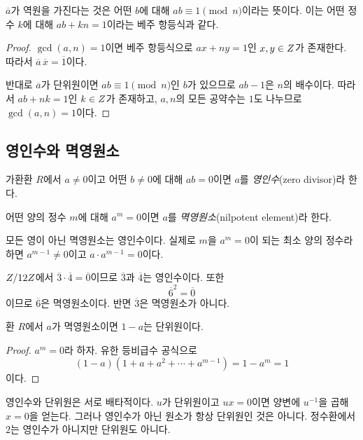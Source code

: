 \begin{proofidea}
$\overline a$가 역원을 가진다는 것은 어떤 $b$에 대해 $ab\equiv1\pmod n$이라는 뜻이다. 이는 어떤 정수 $k$에 대해 $ab+kn=1$이라는 베주 항등식과 같다.
\end{proofidea}

\begin{proof}
$\gcd(a,n)=1$이면 베주 항등식으로 $ax+ny=1$인 $x,y\in Z$가 존재한다. 따라서 $\overline a\,\overline x=\overline1$이다.

반대로 $\overline a$가 단위원이면 $ab\equiv1\pmod n$인 $b$가 있으므로 $ab-1$은 $n$의 배수이다. 따라서 $ab+nk=1$인 $k\in Z$가 존재하고, $a,n$의 모든 공약수는 $1$도 나누므로 $\gcd(a,n)=1$이다.
\end{proof}

\subsection{영인수와 멱영원소}

\begin{definition}[영인수]
가환환 $R$에서 $a\ne0$이고 어떤 $b\ne0$에 대해 $ab=0$이면 $a$를 \emph{영인수}(zero divisor)라 한다.
\end{definition}

\begin{definition}[멱영원소]
어떤 양의 정수 $m$에 대해 $a^m=0$이면 $a$를 \emph{멱영원소}(nilpotent element)라 한다.
\end{definition}

모든 영이 아닌 멱영원소는 영인수이다. 실제로 $m$을 $a^m=0$이 되는 최소 양의 정수라 하면 $a^{m-1}\ne0$이고 $a\cdot a^{m-1}=0$이다.

\begin{example}
$Z/12Z$에서 $\overline3\cdot\overline4=\overline0$이므로 $\overline3$과 $\overline4$는 영인수이다. 또한
\[
  \overline6^2=\overline0
\]
이므로 $\overline6$은 멱영원소이다. 반면 $\overline3$은 멱영원소가 아니다.
\end{example}

\begin{proposition}
환 $R$에서 $a$가 멱영원소이면 $1-a$는 단위원이다.
\end{proposition}

\begin{proof}
$a^m=0$라 하자. 유한 등비급수 공식으로
\[
  (1-a)(1+a+a^2+\cdots+a^{m-1})=1-a^m=1
\]
이다.
\end{proof}

\begin{pitfall}
영인수와 단위원은 서로 배타적이다. $u$가 단위원이고 $ux=0$이면 양변에 $u^{-1}$을 곱해 $x=0$을 얻는다. 그러나 영인수가 아닌 원소가 항상 단위원인 것은 아니다. 정수환에서 $2$는 영인수가 아니지만 단위원도 아니다.
\end{pitfall}

